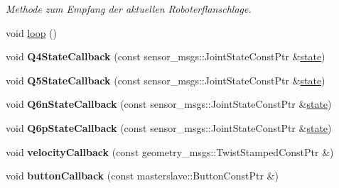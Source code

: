 \begin{DoxyCompactItemize}
\begin{DoxyCompactList}\small\item\em Methode zum Empfang der aktuellen Roboterflanschlage. \end{DoxyCompactList}\item 
void \hyperlink{classGeometricKinematicCommander_aa813582c3cf973c6704dc24077150b3b}{loop} ()
\item 
\hypertarget{classGeometricKinematicCommander_afe8ae9fce613511a87435a920eaa6299}{void {\bfseries Q4\-State\-Callback} (const sensor\-\_\-msgs\-::\-Joint\-State\-Const\-Ptr \&\hyperlink{classICommander_a72cb524deeb95b224db0242efc4728d4}{state})}\label{classGeometricKinematicCommander_afe8ae9fce613511a87435a920eaa6299}

\item 
\hypertarget{classGeometricKinematicCommander_aad8e587222c5aef18ebb28e5df2afbbc}{void {\bfseries Q5\-State\-Callback} (const sensor\-\_\-msgs\-::\-Joint\-State\-Const\-Ptr \&\hyperlink{classICommander_a72cb524deeb95b224db0242efc4728d4}{state})}\label{classGeometricKinematicCommander_aad8e587222c5aef18ebb28e5df2afbbc}

\item 
\hypertarget{classGeometricKinematicCommander_a08ace2af8ea41575b97d4e64425fdd5c}{void {\bfseries Q6n\-State\-Callback} (const sensor\-\_\-msgs\-::\-Joint\-State\-Const\-Ptr \&\hyperlink{classICommander_a72cb524deeb95b224db0242efc4728d4}{state})}\label{classGeometricKinematicCommander_a08ace2af8ea41575b97d4e64425fdd5c}

\item 
\hypertarget{classGeometricKinematicCommander_ad227d224cca51469aed89e3f63a2224b}{void {\bfseries Q6p\-State\-Callback} (const sensor\-\_\-msgs\-::\-Joint\-State\-Const\-Ptr \&\hyperlink{classICommander_a72cb524deeb95b224db0242efc4728d4}{state})}\label{classGeometricKinematicCommander_ad227d224cca51469aed89e3f63a2224b}

\item 
\hypertarget{classGeometricKinematicCommander_a86060fb1189ba2d304bcab2f058609b1}{void {\bfseries velocity\-Callback} (const geometry\-\_\-msgs\-::\-Twist\-Stamped\-Const\-Ptr \&)}\label{classGeometricKinematicCommander_a86060fb1189ba2d304bcab2f058609b1}

\item 
\hypertarget{classGeometricKinematicCommander_a780e85603f9b7201784cfb09706734ae}{void {\bfseries button\-Callback} (const masterslave\-::\-Button\-Const\-Ptr \&)}\label{classGeometricKinematicCommander_a780e85603f9b7201784cfb09706734ae}

\end{DoxyCompactItemize}
